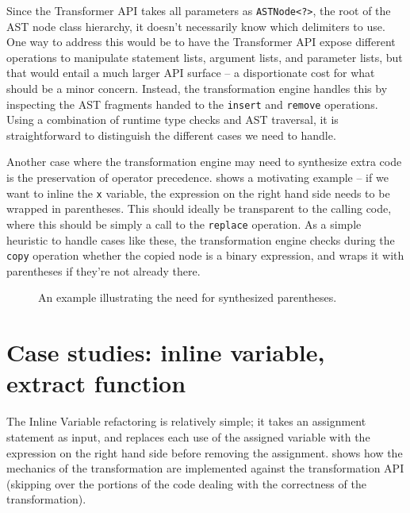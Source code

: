 Since the Transformer API takes all parameters as \texttt{ASTNode<?>}, the root
of the AST node class hierarchy, it doesn't necessarily know which delimiters
to use. One way to address this would be to have the Transformer API expose
different operations to manipulate statement lists, argument lists, and
parameter lists, but that would entail a much larger API surface -- a
disportionate cost for what should be a minor concern. Instead, the
transformation engine handles this by inspecting the AST fragments handed to
the \texttt{insert} and \texttt{remove} operations. Using a combination of
runtime type checks and AST traversal, it is straightforward to distinguish the
different cases we need to handle. %

Another case where the transformation engine may need to synthesize extra code
is the preservation of operator precedence.  shows
a motivating example -- if we want to inline the \texttt{x} variable, the
expression on the right hand side needs to be wrapped in parentheses. This
should ideally be transparent to the calling code, where this should be simply
a call to the \texttt{replace} operation. As a simple heuristic to handle cases
like these, the transformation engine checks during the \texttt{copy} operation
whether the copied node is a binary expression, and wraps it with parentheses
if they're not already there.

\begin{figure}
\begin{minipage}{0.5\linewidth}

\end{minipage}
\hfill \hspace{.3cm} \hfill
\begin{minipage}{0.5\linewidth}

\end{minipage}
\caption{An example illustrating the need for synthesized parentheses.}
\label{Fig:NeedParens}
\end{figure}

\section{Case studies: inline variable, extract function}

The Inline Variable refactoring is relatively simple; it takes an assignment
statement as input, and replaces each use of the assigned variable with the
expression on the right hand side before removing the assignment.
 shows how the mechanics of the transformation are
implemented against the transformation API (skipping over the portions of the
code dealing with the correctness of the transformation).

